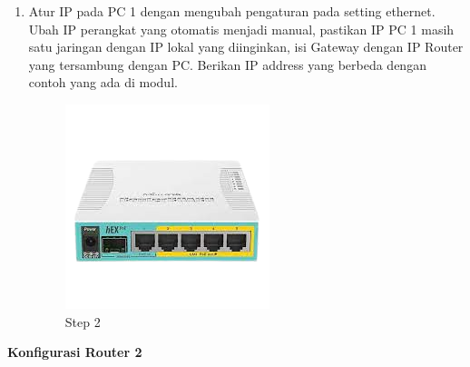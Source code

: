 \begin{enumerate}
	\item Atur IP pada PC 1 dengan mengubah pengaturan pada setting ethernet. Ubah IP perangkat
	yang otomatis menjadi manual, pastikan IP PC 1 masih satu jaringan dengan IP lokal yang
	diinginkan, isi Gateway dengan IP Router yang tersambung dengan PC. Berikan IP address
	yang berbeda dengan contoh yang ada di modul.
	\begin{figure}[H]
		\centering
		\includegraphics[width=0.5\linewidth]{P1/img/contoh.png}
		\caption{Step 2}
		\label{fig:gambar21}
	\end{figure}

\end{enumerate}


\begin{center} 
	\textbf{Konfigurasi Router 2}
\end{center}

